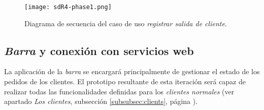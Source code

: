   \begin{sidewaysfigure}[h]
    \begin{center}
      \texttt{[image: sdR4-phase1.png]}
      \caption{Diagrama de secuencia del caso de uso \emph{registrar salida
      de cliente}.}
      \label{fig:sdR4-phase1}
    \end{center}
  \end{sidewaysfigure}


\subsection{\emph{Barra} y conexión con servicios web}
La aplicación de la \emph{barra} se encargará principalmente de gestionar el
estado de los pedidos de los clientes. El prototipo resultante de esta
iteración será capaz de realizar todas las funcionalidades definidas para
los \emph{clientes normales} (ver apartado \emph{Los clientes},
subsección \ref{subsubsec:clients}, página \pageref{subsubsec:clients}).

